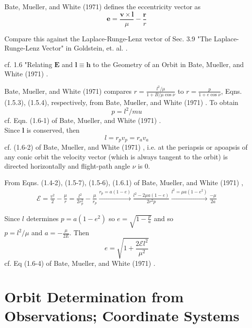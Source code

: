 \documentclass[10pt]{amsart}
\begin{document}
\begin{multicols*}{2}
Bate, Mueller, and White (1971) \cite{BMW1971} defines the eccentricity vector as 
\[
\mathbf{e} = \frac{ \mathbf{v} \times \mathbf{l} }{ \mu} - \frac{\mathbf{r}}{r}
\]

Compare this against the Laplace-Runge-Lenz vector of Sec. 3.9 "The Laplace-Runge-Lenz Vector" in Goldstein, et. al. \cite{HGoldsteinCPooleJSafko2001}.

cf. 1.6 "Relating $\mathbf{E}$ and $\mathbf{l} \equiv \mathbf{h}$ to the Geometry of an Orbit in Bate, Mueller, and White (1971) \cite{BMW1971}.

Bate, Mueller, and White (1971) \cite{BMW1971} compares $r = \frac{ l^2 / \mu}{ 1 + B/\mu \cos{\nu }} $  to $r = \frac{p}{ 1 + e \cos{\nu}} $, Eqns. (1.5.3), (1.5.4), respectively, from Bate, Mueller, and White (1971) \cite{BMW1971}. To obtain
\begin{equation}
	p = l^2 /mu 
\end{equation}
cf. Eqn. (1.6-1) of Bate, Mueller, and White (1971) \cite{BMW1971}.  \\

Since $\mathbf{l}$ is conserved, then 
\begin{equation}
	l = r_p v_p = r_a v_a
\end{equation}
cf. (1.6-2) of Bate, Mueller, and White (1971) \cite{BMW1971}, i.e. at the periapsis or apoapsis of any conic orbit the velocity vector (which is always tangent to the orbit) is directed horizontally and flight-path angle $\nu$ is $0$.

From Eqns. (1.4-2), (1.5-7), (1.5-6), (1.6.1) of Bate, Mueller, and White (1971) \cite{BMW1971},
\[
\begin{gathered}
	\mathcal{E} = \frac{v^2}{2 }  - \frac{\mu}{r} = \frac{l^2}{ 2 r_p^2 } - \frac{\mu}{r_p} \xrightarrow{r_p = a(1-e) }  \frac{ l^2 - 2\mu a(1-e) }{ 2 r^2 p} \xrightarrow{ l^2 = \mu a ( 1- e^2) } \frac{- \mu}{2 a}
\end{gathered}
\]

Since $l$ determines $p = a(1-e^2)$ so $e = \sqrt{ 1 - \frac{p}{a} }$ and so \\
$p = l^2 / \mu$ and $a = - \frac{\mu}{2E}$. Then 
\begin{equation}
	e = \sqrt{ 1 + \frac{2 \mathcal{E} l^2 }{\mu^2} }
\end{equation}
cf. Eq (1.6-4) of Bate, Mueller, and White (1971) \cite{BMW1971}.

\section{Orbit Determination from Observations; Coordinate Systems}


\end{multicols*}
\end{document}

